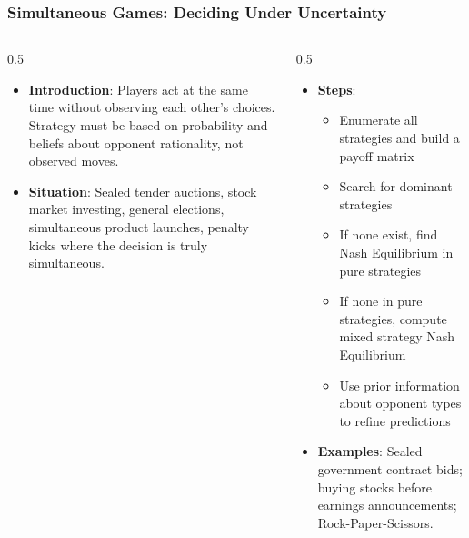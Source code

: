 \begin{frame}[fragile]\frametitle{Simultaneous Games: Deciding Under Uncertainty}
\begin{columns}
    \begin{column}[T]{0.5\linewidth}
      \begin{itemize}
        \item \textbf{Introduction}: Players act at the same time without observing each other's choices. Strategy must be based on probability and beliefs about opponent rationality, not observed moves.
        \item \textbf{Situation}: Sealed tender auctions, stock market investing, general elections, simultaneous product launches, penalty kicks where the decision is truly simultaneous.
      \end{itemize}
    \end{column}
    \begin{column}[T]{0.5\linewidth}
      \begin{itemize}
        \item \textbf{Steps}:
        \begin{itemize}
          \item Enumerate all strategies and build a payoff matrix
          \item Search for dominant strategies
          \item If none exist, find Nash Equilibrium in pure strategies
          \item If none in pure strategies, compute mixed strategy Nash Equilibrium
          \item Use prior information about opponent types to refine predictions
        \end{itemize}\item \textbf{Examples}: Sealed government contract bids; buying stocks before earnings announcements; Rock-Paper-Scissors.
      \end{itemize}
    \end{column}
  \end{columns}
\end{frame}


